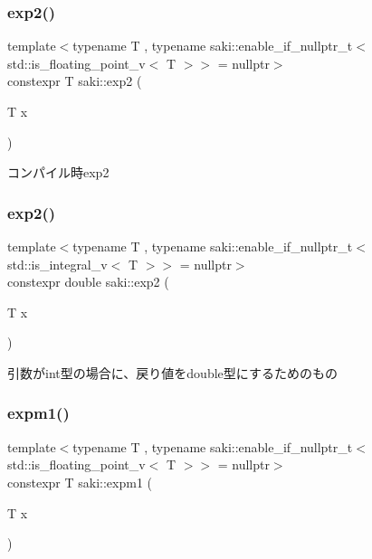 \subsubsection{\texorpdfstring{exp2()}{exp2()}\hspace{0.1cm}{\footnotesize\ttfamily [1/2]}}
{\footnotesize\ttfamily template$<$typename T , typename saki\+::enable\+\_\+if\+\_\+nullptr\+\_\+t$<$ std\+::is\+\_\+floating\+\_\+point\+\_\+v$<$ T $>$$>$  = nullptr$>$ \\
constexpr T saki\+::exp2 (\begin{DoxyParamCaption}\item[{T}]{x }\end{DoxyParamCaption})}



コンパイル時exp2 

\mbox{\label{namespacesaki_a35e9ce74a5f65c8d38a4901bf513ac1e}} 
\subsubsection{\texorpdfstring{exp2()}{exp2()}\hspace{0.1cm}{\footnotesize\ttfamily [2/2]}}
{\footnotesize\ttfamily template$<$typename T , typename saki\+::enable\+\_\+if\+\_\+nullptr\+\_\+t$<$ std\+::is\+\_\+integral\+\_\+v$<$ T $>$$>$  = nullptr$>$ \\
constexpr double saki\+::exp2 (\begin{DoxyParamCaption}\item[{T}]{x }\end{DoxyParamCaption})}



引数がint型の場合に、戻り値をdouble型にするためのもの 

\mbox{\label{namespacesaki_aabb63a6251c75f6f1e76a58f5438de69}} 
\subsubsection{\texorpdfstring{expm1()}{expm1()}\hspace{0.1cm}{\footnotesize\ttfamily [1/2]}}
{\footnotesize\ttfamily template$<$typename T , typename saki\+::enable\+\_\+if\+\_\+nullptr\+\_\+t$<$ std\+::is\+\_\+floating\+\_\+point\+\_\+v$<$ T $>$$>$  = nullptr$>$ \\
constexpr T saki\+::expm1 (\begin{DoxyParamCaption}\item[{T}]{x }\end{DoxyParamCaption})}



